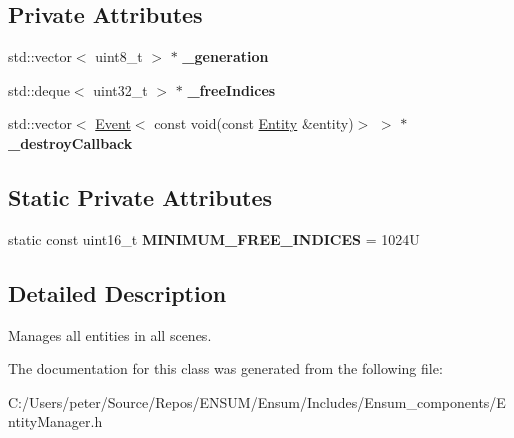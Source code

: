 \subsection*{Private Attributes}
\begin{DoxyCompactItemize}
\item 
std\+::vector$<$ uint8\+\_\+t $>$ $\ast$ {\bfseries \+\_\+generation}\hypertarget{class_ensum_1_1_components_1_1_entity_manager_a4eb470bc60cab8633f8a9811cb9a139f}{}\label{class_ensum_1_1_components_1_1_entity_manager_a4eb470bc60cab8633f8a9811cb9a139f}

\item 
std\+::deque$<$ uint32\+\_\+t $>$ $\ast$ {\bfseries \+\_\+free\+Indices}\hypertarget{class_ensum_1_1_components_1_1_entity_manager_aa90213c24c2e4f8f8c09f9cf1c21a613}{}\label{class_ensum_1_1_components_1_1_entity_manager_aa90213c24c2e4f8f8c09f9cf1c21a613}

\item 
std\+::vector$<$ \hyperlink{class_ensum_1_1_event}{Event}$<$ const void(const \hyperlink{struct_ensum_1_1_components_1_1_entity}{Entity} \&entity)$>$ $>$ $\ast$ {\bfseries \+\_\+destroy\+Callback}\hypertarget{class_ensum_1_1_components_1_1_entity_manager_a1f9c14dc1c320228130200a49fa08b9b}{}\label{class_ensum_1_1_components_1_1_entity_manager_a1f9c14dc1c320228130200a49fa08b9b}

\end{DoxyCompactItemize}
\subsection*{Static Private Attributes}
\begin{DoxyCompactItemize}
\item 
static const uint16\+\_\+t {\bfseries M\+I\+N\+I\+M\+U\+M\+\_\+\+F\+R\+E\+E\+\_\+\+I\+N\+D\+I\+C\+ES} = 1024U\hypertarget{class_ensum_1_1_components_1_1_entity_manager_a6d7bbd2c0c226a051f49382015c24962}{}\label{class_ensum_1_1_components_1_1_entity_manager_a6d7bbd2c0c226a051f49382015c24962}

\end{DoxyCompactItemize}


\subsection{Detailed Description}
Manages all entities in all scenes. 

The documentation for this class was generated from the following file\+:\begin{DoxyCompactItemize}
\item 
C\+:/\+Users/peter/\+Source/\+Repos/\+E\+N\+S\+U\+M/\+Ensum/\+Includes/\+Ensum\+\_\+components/Entity\+Manager.\+h\end{DoxyCompactItemize}
